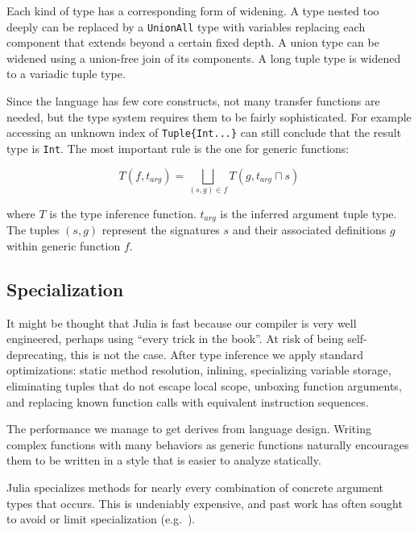 \noindent
Each kind of type has a corresponding form of widening.
A type nested too deeply can be replaced by a \texttt{UnionAll} type
with variables replacing each component that extends beyond a certain
fixed depth.
A union type can be widened using a union-free join of its components.
A long tuple type is widened to a variadic tuple type.

Since the language has few core constructs, not many transfer functions
are needed, but the type system requires them to be fairly sophisticated.
For example accessing an unknown index of \texttt{Tuple\{Int...\}} can
still conclude that the result type is \texttt{Int}.
The most important rule is the one for generic functions:

\[
T(f,t_{arg}) = \bigsqcup_{(s,g) \in f}T(g,t_{arg} \sqcap s)
\]

\noindent
where $T$ is the type inference function.
$t_{arg}$ is the inferred argument tuple type.
The tuples $(s,g)$ represent the signatures $s$ and their associated
definitions $g$ within generic function $f$.


\subsection{Specialization}

It might be thought that Julia is fast because our compiler is very well
engineered, perhaps using ``every trick in the book''.
At risk of being self-deprecating, this is not the case.
After type inference we apply standard optimizations: static method
resolution, inlining, specializing variable storage, eliminating tuples
that do not escape local scope, unboxing function arguments, and
replacing known function calls with equivalent instruction sequences.

The performance we manage to get derives from language design.
Writing complex functions with many behaviors as generic functions
naturally encourages them to be written in a style that is easier to
analyze statically.

Julia specializes methods for nearly every combination of concrete
argument types that occurs.
This is undeniably expensive, and past work has often sought to avoid
or limit specialization (e.g.\ \cite{Dragos:2009:CGT:1565824.1565830}).


